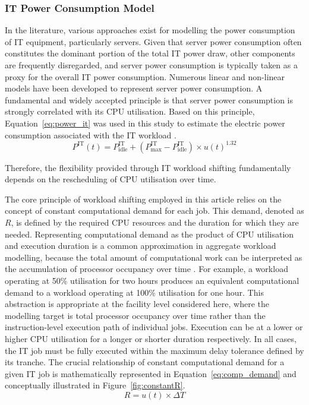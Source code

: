 \documentclass[lettersize,journal]{IEEEtran}
\newcommand{\rev}[1]{#1}
\begin{document}
\subsubsection{IT Power Consumption Model}

 In the literature, various approaches exist for modelling the power consumption of IT equipment, particularly servers. Given that server power consumption often constitutes the dominant portion of the total IT power draw, other components are frequently disregarded, and server power consumption is typically taken as a proxy for the overall IT power consumption. Numerous linear and non-linear models have been developed to represent server power consumption. A fundamental and widely accepted principle is that server power consumption is strongly correlated with its CPU utilisation. \rev{Based on this principle,} Equation~\ref{eq:power_it} was used in this study to estimate the electric power consumption associated with the IT workload \cite{dayarathna2015data,v2015analysis}.
\begin{equation}
P^{\mathrm{IT}}(t) = P^{\mathrm{IT}}_{\mathrm{idle}} + (P^{\mathrm{IT}}_{\mathrm{max}} - P^{\mathrm{IT}}_{\mathrm{idle}}) \times u(t)^{1.32}
\label{eq:power_it}
\end{equation}



Therefore, the flexibility provided through IT workload shifting fundamentally depends on the rescheduling of CPU utilisation over time.

The core principle of workload shifting employed in this article relies on the concept of constant computational demand for each job. This demand, denoted as $R$, is defined by the required CPU resources and the duration for which they are needed. \rev{Representing computational demand as the product of CPU utilisation and execution duration is a common approximation in aggregate workload modelling, because the total amount of computational work can be interpreted as the accumulation of processor occupancy over time \cite{dayarathna2015data,6779441,Cao2022ApEn}. For example, a workload operating at 50\% utilisation for two hours produces an equivalent computational demand to a workload operating at 100\% utilisation for one hour. This abstraction is appropriate at the facility level considered here, where the modelling target is total processor occupancy over time rather than the instruction-level execution path of individual jobs.} Execution can be at a lower or higher CPU utilisation for a longer or shorter duration respectively. In all cases, the IT job must be fully executed within the maximum delay tolerance defined by its tranche. The crucial relationship of constant computational demand for a given IT job is mathematically represented in Equation~\ref{eq:comp_demand} and conceptually illustrated in Figure~\ref{fig:constantR}.
\begin{equation}
R = u(t) \times \Delta T
\label{eq:comp_demand}
\end{equation}
\end{document}
